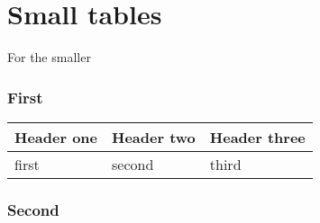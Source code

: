 \documentclass{article}
\begin{document}
\part*{Small tables}

For the smaller

\section*{First}


\begin{tabular}{l | l | l}
Header one  &  Header two  &  Header three
\\
\hline

first  &  second  &  third
\\

\end{tabular}

\section*{Second}
\end{document}
